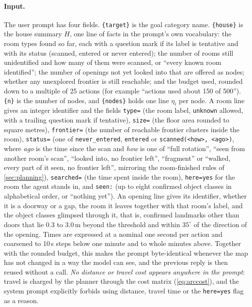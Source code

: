 \documentclass[10pt]{article}
\begin{document}
\paragraph{Input.} The user prompt has four fields. \texttt{\{target\}} is the goal category name. \texttt{\{house\}} is the house summary $H$, one line of facts in the prompt's own vocabulary: the room types found so far, each with a question mark if its label is tentative and with its status (scanned, entered or never entered); the number of rooms still unidentified and how many of them were scanned, or ``every known room identified''; the number of openings not yet looked into that are offered as nodes; whether any unexplored frontier is still reachable; and the budget used, rounded down to a multiple of 25 actions (for example ``actions used about 150 of 500''). \texttt{\{n\}} is the number of nodes, and \texttt{\{nodes\}} holds one line $\eta_i$ per node.
A room line gives an integer identifier and the fields \texttt{type=} (the room label, \texttt{unknown} allowed, with a trailing question mark if tentative), \texttt{size=} (the floor area rounded to square metres), \texttt{frontier=} (the number of reachable frontier clusters inside the room), \texttt{status=} (one of \texttt{never\_entered}, \texttt{entered} or \texttt{scanned(<how>, <ago>)}, where \emph{ago} is the time since the scan and \emph{how} is one of ``full rotation'', ``seen from another room's scan'', ``looked into, no frontier left'', ``fragment'' or ``walked, every part of it seen, no frontier left'', mirroring the room-finished rules of \cref{sec:planning}), \texttt{searched=} (the time spent inside the room), \texttt{here=yes} for the room the agent stands in, and \texttt{seen:} (up to eight confirmed object classes in alphabetical order, or ``nothing yet'').
An opening line gives its identifier, whether it is a doorway or a gap, the room it leaves together with that room's label, and the object classes glimpsed through it, that is, confirmed landmarks other than doors that lie 0.3 to 3.0\,m beyond the threshold and within $35^\circ$ of the direction of the opening.
Times are expressed at a nominal one second per action and coarsened to 10\,s steps below one minute and to whole minutes above. Together with the rounded budget, this makes the prompt byte-identical whenever the map has not changed in a way the model can see, and the previous reply is then reused without a call.
\emph{No distance or travel cost appears anywhere in the prompt}: travel is charged by the planner through the cost matrix (\cref{eq:arccost}), and the system prompt explicitly forbids using distance, travel time or the \texttt{here=yes} flag as a reason.
\end{document}
